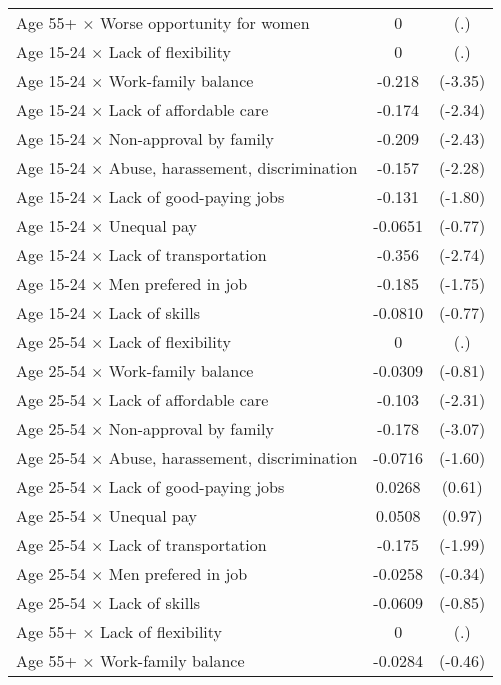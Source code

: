 {\begin{longtable}{l*{1}{cc}}
Age 55+ $\times$ Worse opportunity for women&           0         &         (.)\\
Age 15-24 $\times$ Lack of flexibility&           0         &         (.)\\
Age 15-24 $\times$ Work-family balance&      -0.218\sym{***}&     (-3.35)\\
Age 15-24 $\times$ Lack of affordable care&      -0.174\sym{*}  &     (-2.34)\\
Age 15-24 $\times$ Non-approval by family&      -0.209\sym{*}  &     (-2.43)\\
Age 15-24 $\times$ Abuse, harassement, discrimination&      -0.157\sym{*}  &     (-2.28)\\
Age 15-24 $\times$ Lack of good-paying jobs&      -0.131         &     (-1.80)\\
Age 15-24 $\times$ Unequal pay&     -0.0651         &     (-0.77)\\
Age 15-24 $\times$ Lack of transportation&      -0.356\sym{**} &     (-2.74)\\
Age 15-24 $\times$ Men prefered in job&      -0.185         &     (-1.75)\\
Age 15-24 $\times$ Lack of skills&     -0.0810         &     (-0.77)\\
Age 25-54 $\times$ Lack of flexibility&           0         &         (.)\\
Age 25-54 $\times$ Work-family balance&     -0.0309         &     (-0.81)\\
Age 25-54 $\times$ Lack of affordable care&      -0.103\sym{*}  &     (-2.31)\\
Age 25-54 $\times$ Non-approval by family&      -0.178\sym{**} &     (-3.07)\\
Age 25-54 $\times$ Abuse, harassement, discrimination&     -0.0716         &     (-1.60)\\
Age 25-54 $\times$ Lack of good-paying jobs&      0.0268         &      (0.61)\\
Age 25-54 $\times$ Unequal pay&      0.0508         &      (0.97)\\
Age 25-54 $\times$ Lack of transportation&      -0.175\sym{*}  &     (-1.99)\\
Age 25-54 $\times$ Men prefered in job&     -0.0258         &     (-0.34)\\
Age 25-54 $\times$ Lack of skills&     -0.0609         &     (-0.85)\\
Age 55+ $\times$ Lack of flexibility&           0         &         (.)\\
Age 55+ $\times$ Work-family balance&     -0.0284         &     (-0.46)\\

\end{longtable}}
